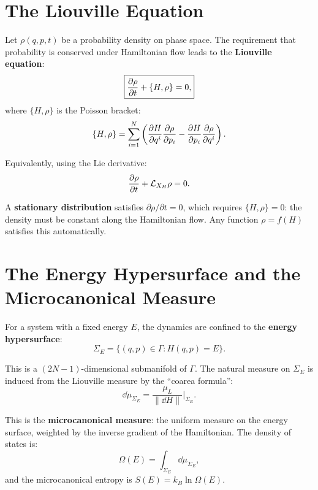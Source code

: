 \section{The Liouville Equation}

Let $\rho(q, p, t)$ be a probability density on phase space. The requirement that probability is conserved under Hamiltonian flow leads to the \textbf{Liouville equation}:
\begin{equation}
\boxed{\pdv{\rho}{t} + \{H, \rho\} = 0,}
\end{equation}
where $\{H, \rho\}$ is the Poisson bracket:
\begin{equation}
\{H, \rho\} = \sum_{i=1}^{N}\left(\pdv{H}{q^i}\pdv{\rho}{p_i} - \pdv{H}{p_i}\pdv{\rho}{q^i}\right).
\end{equation}

Equivalently, using the Lie derivative:
\begin{equation}
\pdv{\rho}{t} + \mathcal{L}_{X_H}\rho = 0.
\end{equation}

A \textbf{stationary distribution} satisfies $\partial\rho/\partial t = 0$, which requires $\{H, \rho\} = 0$: the density must be constant along the Hamiltonian flow. Any function $\rho = f(H)$ satisfies this automatically.

\section{The Energy Hypersurface and the Microcanonical Measure}

For a system with a fixed energy $E$, the dynamics are confined to the \textbf{energy hypersurface}:
\begin{equation}
\Sigma_E = \{(q, p) \in \Gamma : H(q, p) = E\}.
\end{equation}

This is a $(2N-1)$-dimensional submanifold of $\Gamma$. The natural measure on $\Sigma_E$ is induced from the Liouville measure by the ``coarea formula'':
\begin{equation}
\dd\mu_{\Sigma_E} = \frac{\mu_L}{\|\dd H\|}\bigg|_{\Sigma_E}.
\end{equation}

This is the \textbf{microcanonical measure}: the uniform measure on the energy surface, weighted by the inverse gradient of the Hamiltonian. The density of states is:
\begin{equation}
\Omega(E) = \int_{\Sigma_E} \dd\mu_{\Sigma_E},
\end{equation}
and the microcanonical entropy is $S(E) = k_B \ln\Omega(E)$.

